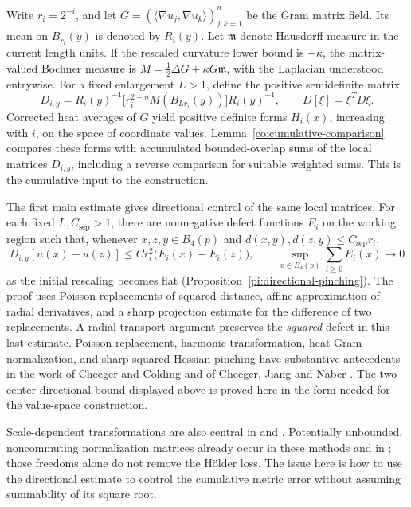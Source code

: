 Write \(r_i=2^{-i}\), and let
\(G=(\langle\nabla u_j,\nabla u_k\rangle)_{j,k=1}^n\) be the Gram
matrix field. Its mean on \(B_{r_i}(y)\) is denoted by \(R_i(y)\).
Let \(\mathfrak m\) denote Hausdorff measure in the current length
units. If the rescaled curvature lower bound is \(-\kappa\), the
matrix-valued Bochner measure is
\(M=\tfrac12\Delta G+\kappa G\mathfrak m\), with the Laplacian
understood entrywise. For a fixed enlargement \(L>1\), define the
positive semidefinite matrix
\[
 D_{i,y}=R_i(y)^{-1}
       \bigl[r_i^{2-n}M(B_{Lr_i}(y))\bigr]R_i(y)^{-1},
 \qquad D[\xi]=\xi^TD\xi.
\]
Corrected heat averages of \(G\) yield positive definite forms
\(H_i(x)\), increasing with \(i\), on the space of coordinate
values. Lemma~\ref{co:cumulative-comparison} compares these forms
with accumulated bounded-overlap sums of the local matrices
\(D_{i,y}\), including a reverse comparison for suitable weighted
sums. This is the cumulative input to the construction.

The first main estimate gives directional control of the same local
matrices. For each fixed \(L,C_{\mathrm{sep}}>1\), there are
nonnegative defect functions \(E_i\) on the working region such that,
whenever \(x,z,y\in B_4(p)\) and
\(d(x,y),d(z,y)\le C_{\mathrm{sep}}r_i\),
\[
 D_{i,y}[u(x)-u(z)]
 \le C r_i^2\bigl(E_i(x)+E_i(z)\bigr),
 \qquad \sup_{x\in B_4(p)}\sum_{i\ge0}E_i(x)\longrightarrow0
\]
as the initial rescaling becomes flat
(Proposition~\ref{pi:directional-pinching}). The proof uses Poisson
replacements of squared distance, affine approximation of radial
derivatives, and a sharp projection estimate for the difference of
two replacements. A radial transport argument preserves the
\emph{squared} defect in this last estimate. Poisson replacement,
harmonic transformation, heat Gram normalization, and sharp
squared-Hessian pinching have substantive antecedents in the work
of Cheeger and Colding and of Cheeger, Jiang and Naber
\cite{CC96,CJN21}. The two-center directional bound displayed above
is proved here in the form needed for the value-space construction.

Scale-dependent transformations are also central in
\cite[Theorem~1.32]{CN15} and \cite[Theorems~1.7 and 4.1]{HH24}.
Potentially unbounded, noncommuting normalization matrices already
occur in these methods and in \cite[Theorem~3.8]{HZ26}; those
freedoms alone do not remove the H\"older loss. The issue here is
how to use the directional estimate to control the cumulative
metric error without assuming summability of its square root.


